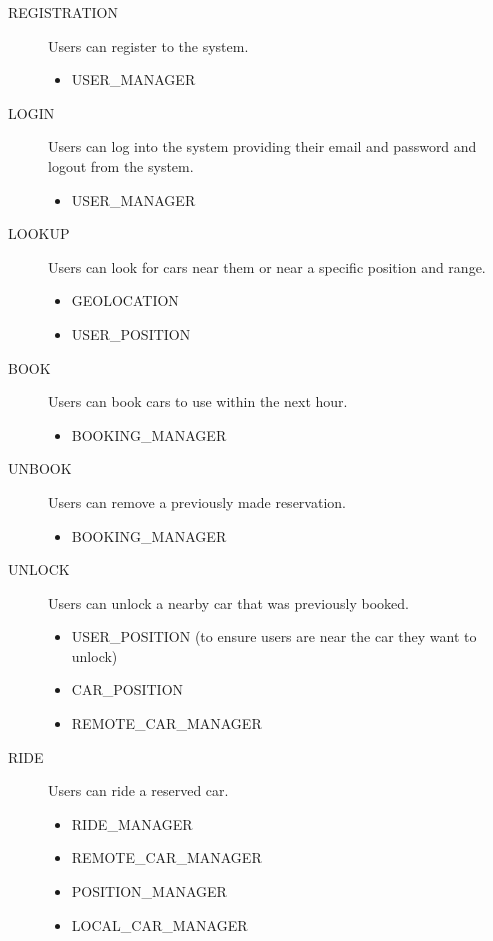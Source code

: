 \documentclass[11pt]{article} %
\begin{document}
\begin{description}
	\item[REGISTRATION] Users can register to the system.
		\begin{itemize}
			\item USER\_MANAGER
		\end{itemize}

	\item[LOGIN]  Users can log into the system providing their email and password and logout from the system.
		\begin{itemize}
			\item USER\_MANAGER
		\end{itemize}

	\item[LOOKUP] Users can look for cars near them or near a specific position and range.
		\begin{itemize}
			\item GEOLOCATION
			\item USER\_POSITION
		\end{itemize}

	\item[BOOK] Users can book cars to use within the next hour.
		\begin{itemize}
			\item BOOKING\_MANAGER
		\end{itemize}

	\item[UNBOOK] Users can remove a previously made reservation.
		\begin{itemize}
			\item BOOKING\_MANAGER
		\end{itemize}

	\item[UNLOCK] Users can unlock a nearby car that was previously booked.
		\begin{itemize}
			\item USER\_POSITION (to ensure  users are near the car they want to unlock)
			\item CAR\_POSITION
			\item REMOTE\_CAR\_MANAGER
		\end{itemize}

	\item[RIDE] Users can ride a reserved car.
		\begin{itemize}
			\item RIDE\_MANAGER
			\item REMOTE\_CAR\_MANAGER
			\item POSITION\_MANAGER
			\item LOCAL\_CAR\_MANAGER
		\end{itemize}


\end{description}
\end{document}
